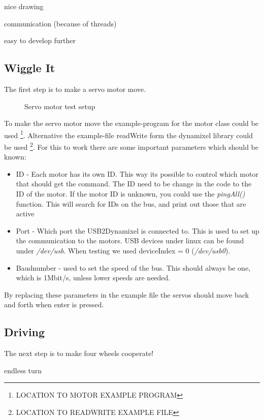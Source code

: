 nice drawing

communication (because of threads)

easy to develop further

\subsection{Wiggle It}

The first step is to make a servo motor move. 

\begin{figure}[H]
    \centering
    \caption{Servo motor test setup}
    \label{fig:servo} 
\end{figure}

To make the servo motor move the example-program for the motor class could be used \footnote{LOCATION TO MOTOR EXAMPLE PROGRAM}. Alternative the example-file readWrite form the dynamixel library could be used \footnote{LOCATION TO READWRITE EXAMPLE FILE}. 
For this to work there are some important parameters which should be known:
\begin{itemize}
     \item ID - Each motor has its own ID. This way its possible to control which motor that should get the command. The ID need to be change in the code to the ID of the motor. If the motor ID is unknown, you could use the \textit{pingAll()} function. This will search for IDs on the bus, and print out those that are active
     \item Port - Which port the USB2Dynamixel is connected to. This is used to set up the communication to the motors. USB devices under linux can be found under \textit{/dev/usb}. When testing we used deviceIndex = 0 (\textit{/dev/usb0}).
     \item Baudnumber - used to set the speed of the bus. This should always be one, which is 1Mbit/s, unless lower speeds are needed.
\end{itemize}
\vspace{\secspace}

By replacing these parameters in the example file the servos should move back and forth when enter is pressed.


\subsection{Driving}
The next step is to make four wheels cooperate!

endless turn

